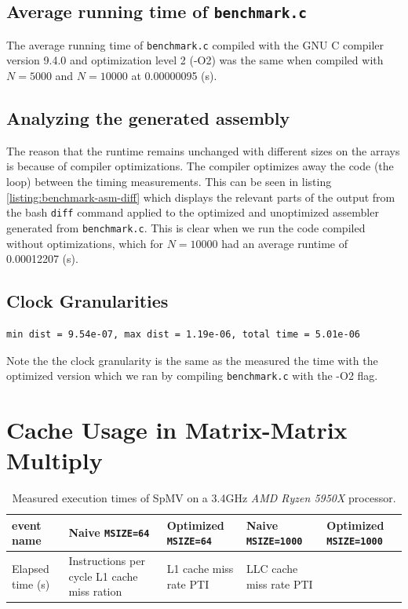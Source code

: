 \documentclass[a4paper, 11pt]{article}
\begin{document}
\subsection{Average running time of \texttt{benchmark.c}}
The average running time of \texttt{benchmark.c} compiled with the GNU C compiler version 9.4.0 and optimization level 2 (-O2) was the same
when compiled with $N=5000$ and $N=10000$ at 0.00000095 (s).

\subsection{Analyzing the generated assembly}
The reason that the runtime remains unchanged with different sizes on the arrays is because of compiler optimizations. The compiler optimizes away the
code (the loop) between the timing measurements. This can be seen in listing \ref{listing:benchmark-asm-diff} which displays the relevant parts of the output
from the bash \texttt{diff} command applied to the optimized and unoptimized assembler generated from \texttt{benchmark.c}. This is clear when we run the code
compiled without optimizations, which for $N=10000$ had an average runtime of 0.00012207 (s).

\subsection{Clock Granularities}
\begin{lstlisting}
min dist = 9.54e-07, max dist = 1.19e-06, total time = 5.01e-06
\end{lstlisting}
Note the the clock granularity is the same as the measured the time with the optimized version which we ran by compiling \texttt{benchmark.c} with the -O2 flag.


\section{Cache Usage in Matrix-Matrix Multiply}

\begin{table}[H]\label{ta:measured-times-sparse}
\centering
\begin{tabular}[c]{|p{2cm}|p{2cm}|p{2cm}|p{2cm}|p{2cm}|}
\hline
event name & Naive \texttt{MSIZE=64} & Optimized \texttt{MSIZE=64} & Naive \texttt{MSIZE=1000} & Optimized \texttt{MSIZE=1000} \\
\hline
Elapsed time (s) &                  
Instructions per cycle
L1 cache miss ration &
L1 cache miss rate PTI &
LLC cache miss rate PTI &
\hline
\end{tabular}
\caption{Measured execution times of SpMV on a 3.4GHz \textit{AMD Ryzen 5950X} processor.}
\end{table}
\end{document}
